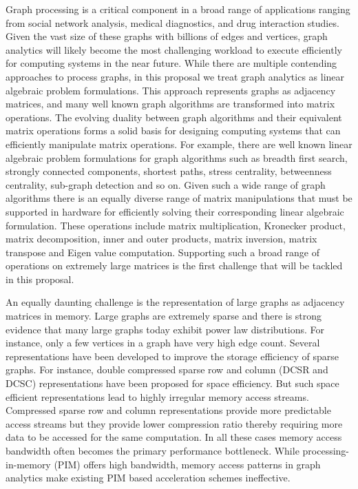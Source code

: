 \noindent
Graph processing is a critical component in a broad range of applications ranging from  social network analysis, medical diagnostics, and drug interaction studies. 
Given the vast size of these graphs with billions of edges and vertices, graph analytics will likely become the most challenging workload to execute efficiently for computing systems in the near future. 
While there are multiple contending approaches to process graphs, in this proposal we treat graph analytics as linear algebraic problem formulations. 
This approach represents graphs as adjacency matrices, and many well known graph algorithms are transformed into matrix operations. 
The evolving duality between graph algorithms and their equivalent matrix operations forms a solid basis for designing computing systems that can efficiently manipulate matrix operations. 
For example, there are well known linear algebraic problem formulations for graph algorithms such as breadth first search, strongly connected components, shortest paths, stress centrality, betweenness centrality,  sub-graph detection and so on. 
Given such a wide range of graph algorithms there is an equally diverse range of matrix manipulations that must be supported in hardware for efficiently solving their corresponding linear algebraic formulation. 
These operations include matrix multiplication, Kronecker product,  matrix decomposition, inner and outer products, matrix inversion, matrix transpose and Eigen value computation. 
Supporting such a broad range of operations on extremely large matrices is the first challenge that will be tackled in this proposal. 

An equally daunting challenge is the representation of large graphs as adjacency matrices in memory. 
Large graphs are extremely sparse and there is strong evidence that many large graphs today exhibit power law distributions. 
For instance, only a few vertices in a graph have very high edge count. 
Several representations have been developed to improve the storage efficiency of sparse graphs. 
For instance, double compressed sparse row and column (DCSR and DCSC) representations have been proposed for space efficiency. 
But such space efficient representations lead to highly irregular memory access streams. 
Compressed sparse row and column representations provide more predictable access streams but they provide lower compression ratio thereby requiring more data to be accessed for the same computation. 
In all these cases memory access bandwidth often becomes the primary performance bottleneck.  
While processing-in-memory (PIM) offers high bandwidth, memory access patterns in graph analytics make existing PIM based acceleration schemes ineffective. 

